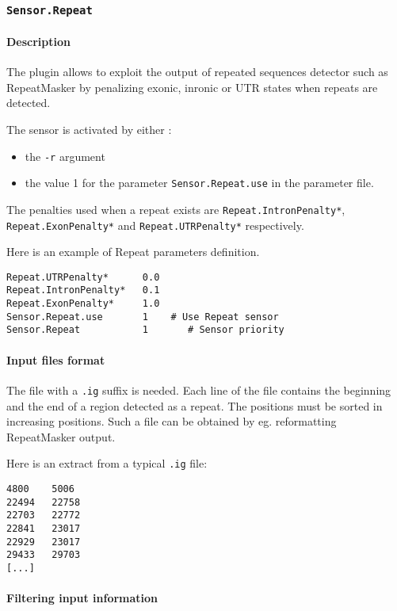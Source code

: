 
\subsubsection{\texttt{Sensor.Repeat}}

\paragraph{Description}

The plugin allows to exploit the output of repeated sequences detector
such as RepeatMasker by penalizing exonic, inronic or UTR states when
repeats are detected.

The sensor is activated by either :
\begin{itemize}
\item the \texttt{-r} argument 
\item the value 1 for the parameter \texttt{Sensor.Repeat.use} in the
  parameter file.
\end{itemize}
The penalties used when a repeat exists are \texttt{Repeat.IntronPenalty*},
\texttt{Repeat.ExonPenalty*} and \texttt{Repeat.UTRPenalty*}
respectively.

Here is an example of Repeat parameters definition.
\begin{Verbatim}[fontsize=\small]
Repeat.UTRPenalty*      0.0
Repeat.IntronPenalty*   0.1
Repeat.ExonPenalty*     1.0
Sensor.Repeat.use       1    # Use Repeat sensor
Sensor.Repeat           1       # Sensor priority
\end{Verbatim}

\paragraph{Input files format}

The file with a \texttt{.ig} suffix is needed. Each line of the file
contains the beginning and the end of a region detected as a
repeat. The positions must be sorted in increasing positions. Such a
file can be obtained by eg. reformatting RepeatMasker output.

Here is an extract from a typical \texttt{.ig} file:
\begin{Verbatim}[fontsize=\small]
4800    5006
22494   22758
22703   22772
22841   23017
22929   23017
29433   29703
[...]
\end{Verbatim}

\paragraph{Filtering input information}

